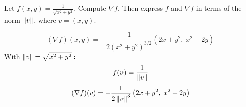 \begin{exercise}
	Let $ f(x,y) = \frac{1}{\sqrt{x^2 + y^2}} $. Compute $\nabla f$. Then express $f$ and $\nabla f$ in terms of the norm $\left\lVert v \right\rVert$, where $ v = (x,y) $.
\end{exercise}

\begin{solution}
	$$
		(\nabla f)(x,y) = -\frac{1}{2(x^2 + y^2)^{3/2}} \left( 2x+y^2, \; x^2+2y \right)
	$$
	With $ \left\lVert v \right\rVert = \sqrt{x^2 + y^2}:$
	$$
		f(v) = \frac{1}{\left\lVert v \right\rVert}
	$$
	$$
		(\nabla f)(v) = -\frac{1}{2 \left\lVert v \right\rVert^3} \left( 2x+y^2, \; x^2+2y \right)
	$$
\end{solution}
